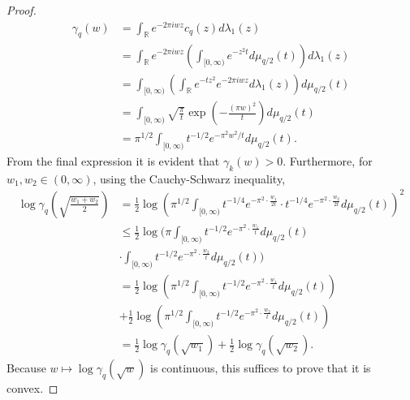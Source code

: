 \documentclass{article}
\theoremstyle{definition}
\theoremstyle{definition}
\begin{document}
\begin{proof}
\begin{align*}
\gamma_q(w)&=\int_\mathbb{R} e^{-2\pi iwz} c_q(z) d\lambda_1(z)\\
&=\int_\mathbb{R} e^{-2\pi iwz} \left( \int_{[0,\infty)} e^{-z^2 t}  d\mu_{q/2}(t)\right) d\lambda_1(z)\\
&=\int_{[0,\infty)}  \left( \int_{\mathbb{R}}  e^{-t z^2}e^{-2\pi iwz} d\lambda_1(z)\right) d\mu_{q/2}(t)\\
&=\int_{[0,\infty)} \sqrt{\frac{\pi}{t}} \exp\left(-\frac{(\pi w)^2}{t} \right)d\mu_{q/2}(t)\\
&=\pi^{1/2} \int_{[0,\infty)} t^{-1/2} e^{-\pi^2 w^2/t} d\mu_{q/2}(t).
\end{align*}
From the final expression it is evident that $\gamma_k(w) > 0$. 
Furthermore, for $w_1,w_2 \in (0,\infty)$, using the Cauchy-Schwarz inequality,
\begin{align*}
\log \gamma_q\left( \sqrt{\frac{w_1+w_2}{2}}\right)&=\frac{1}{2} \log  
 \left(\pi^{1/2}  \int_{[0,\infty)} t^{-1/4} e^{-\pi^2 \cdot \frac{w_1}{2t}}  \cdot t^{-1/4}
 e^{-\pi^2 \cdot \frac{w_2}{2t}} 
 d\mu_{q/2}(t)\right)^2\\
 &\leq \frac{1}{2} \log \bigg( \pi    \int_{[0,\infty)} t^{-1/2} e^{-\pi^2 \cdot \frac{w_1}{t}}  
 d\mu_{q/2}(t)\\
 &\cdot  \int_{[0,\infty)} t^{-1/2} e^{-\pi^2 \cdot \frac{w_2}{t}}  
 d\mu_{q/2}(t) \bigg)\\
 &=\frac{1}{2} \log \left( \pi^{1/2}   \int_{[0,\infty)} t^{-1/2} e^{-\pi^2 \cdot \frac{w_1}{t}}  
 d\mu_{q/2}(t)\right)\\
 &+\frac{1}{2} \log \left( \pi^{1/2}   \int_{[0,\infty)} t^{-1/2} e^{-\pi^2 \cdot \frac{w_2}{t}}  
 d\mu_{q/2}(t)\right)\\
 &=\frac{1}{2} \log \gamma_q(\sqrt{w_1})+\frac{1}{2} \log \gamma_q(\sqrt{w_2}).
\end{align*}
Because $w \mapsto \log \gamma_q(\sqrt{w})$ is continuous, this suffices to prove that it is convex.
\end{proof}
\end{document}
